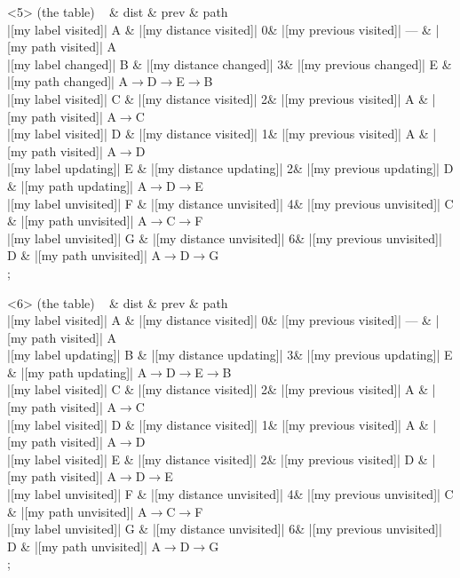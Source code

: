 \begin{onlyenv}<5>
 (the table) {
~ \& dist \& prev \& path \\
|[my label visited]| A \& |[my distance visited]| 0\& |[my previous visited]| --- \& |[my path visited]| A\\
|[my label changed]| B \& |[my distance changed]| 3\& |[my previous changed]| E \& |[my path changed]| A$\rightarrow$D$\rightarrow$E$\rightarrow$B\\
|[my label visited]| C \& |[my distance visited]| 2\& |[my previous visited]| A \& |[my path visited]| A$\rightarrow$C\\
|[my label visited]| D \& |[my distance visited]| 1\& |[my previous visited]| A \& |[my path visited]| A$\rightarrow$D\\
|[my label updating]| E \& |[my distance updating]| 2\& |[my previous updating]| D \& |[my path updating]| A$\rightarrow$D$\rightarrow$E\\
|[my label unvisited]| F \& |[my distance unvisited]| 4\& |[my previous unvisited]| C \& |[my path unvisited]| A$\rightarrow$C$\rightarrow$F\\
|[my label unvisited]| G \& |[my distance unvisited]| 6\& |[my previous unvisited]| D \& |[my path unvisited]| A$\rightarrow$D$\rightarrow$G\\
};
\end{onlyenv}
            
\begin{onlyenv}<6>
 (the table) {
~ \& dist \& prev \& path \\
|[my label visited]| A \& |[my distance visited]| 0\& |[my previous visited]| --- \& |[my path visited]| A\\
|[my label updating]| B \& |[my distance updating]| 3\& |[my previous updating]| E \& |[my path updating]| A$\rightarrow$D$\rightarrow$E$\rightarrow$B\\
|[my label visited]| C \& |[my distance visited]| 2\& |[my previous visited]| A \& |[my path visited]| A$\rightarrow$C\\
|[my label visited]| D \& |[my distance visited]| 1\& |[my previous visited]| A \& |[my path visited]| A$\rightarrow$D\\
|[my label visited]| E \& |[my distance visited]| 2\& |[my previous visited]| D \& |[my path visited]| A$\rightarrow$D$\rightarrow$E\\
|[my label unvisited]| F \& |[my distance unvisited]| 4\& |[my previous unvisited]| C \& |[my path unvisited]| A$\rightarrow$C$\rightarrow$F\\
|[my label unvisited]| G \& |[my distance unvisited]| 6\& |[my previous unvisited]| D \& |[my path unvisited]| A$\rightarrow$D$\rightarrow$G\\
};
\end{onlyenv}
            
